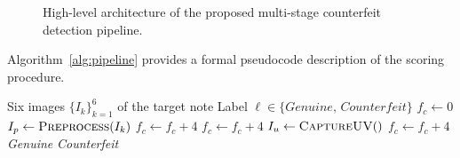 \documentclass[10pt,a4paper,twocolumn,twoside]{article}
\begin{document}
\begin{figure}[ht]
\centering
\setlength{\fboxsep}{8pt}
\caption{High-level architecture of the proposed multi-stage
         counterfeit detection pipeline.}
\label{fig:workflow}
\end{figure}

Algorithm~\ref{alg:pipeline} provides a formal pseudocode
description of the scoring procedure.

\begin{algorithm}[ht]
\small
\caption{Multi-Feature Counterfeit Detection}
\label{alg:pipeline}
\begin{algorithmic}[1]
\Require Six images $\{I_k\}_{k=1}^{6}$ of the target note
\Ensure Label $\ell \in \{\textit{Genuine},\,\textit{Counterfeit}\}$
\State $f_c \leftarrow 0$
  \State $I_p \leftarrow \textsc{Preprocess}(I_k)$
    \State $f_c \leftarrow f_c + 4$
  \EndIf
    \State $f_c \leftarrow f_c + 4$
  \EndIf
  \State $I_u \leftarrow \textsc{CaptureUV}()$
    \State $f_c \leftarrow f_c + 4$
  \EndIf
\EndFor
{}
  \Return \textit{Genuine}
\Else
  \Return \textit{Counterfeit}
\EndIf
\end{algorithmic}
\end{algorithm}
\end{document}
